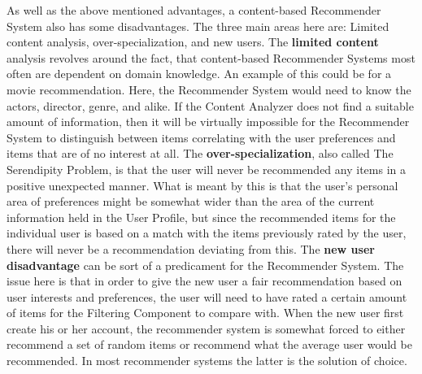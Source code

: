 As well as the above mentioned advantages, a content-based Recommender System also has some disadvantages. The three main areas here are: Limited content analysis, over-specialization, and new users.\newline
The \textbf{limited content} analysis revolves around the fact, that content-based Recommender Systems most often are dependent on domain knowledge. An example of this could be for a movie recommendation. Here, the Recommender System would need to know the actors, director, genre, and alike. If the Content Analyzer does not find a suitable amount of information, then it will be virtually impossible for the Recommender System to distinguish between items correlating with the user preferences and items that are of no interest at all.\newline
The \textbf{over-specialization}, also called The Serendipity Problem, is that the user will never be recommended any items in a positive unexpected manner. What is meant by this is that the user's personal area of preferences might be somewhat wider than the area of the current information held in the User Profile, but since the recommended items for the individual user is based on a match with the items previously rated by the user, there will never be a recommendation deviating from this.\newline
The \textbf{new user disadvantage} can be sort of a predicament for the Recommender System. The issue here is that in order to give the new user a fair recommendation based on user interests and preferences, the user will need to have rated a certain amount of items for the Filtering Component to compare with. When the new user first create his or her account, the recommender system is somewhat forced to either recommend a set of random items or recommend what the average user would be recommended. In most recommender systems the latter is the solution of choice.

